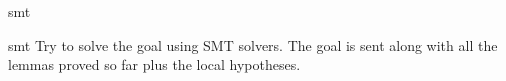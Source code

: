 \begin{tactic}{smt}
  \begin{tsyntax}[empty]{smt}
  Try to solve the goal using SMT solvers. The goal is sent along with all the
  lemmas proved so far plus the local hypotheses.
  \end{tsyntax}

\end{tactic}
